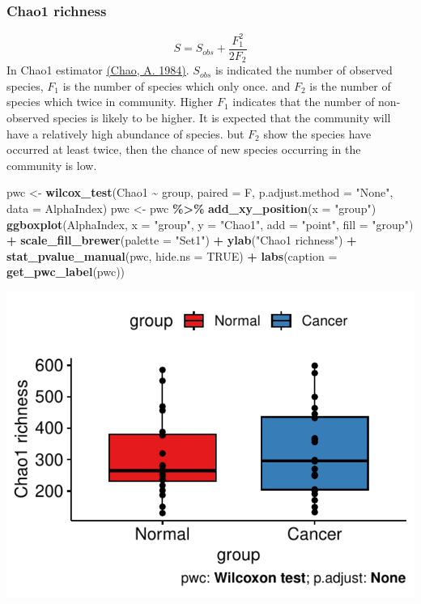 \documentclass[
]{article}
\newenvironment{Shaded}{\begin{snugshade}}{\end{snugshade}}
\newcommand{\AttributeTok}[1]{\textcolor[rgb]{0.13,0.29,0.53}{#1}}
\newcommand{\ConstantTok}[1]{\textcolor[rgb]{0.56,0.35,0.01}{#1}}
\newcommand{\FunctionTok}[1]{\textcolor[rgb]{0.13,0.29,0.53}{\textbf{#1}}}
\newcommand{\NormalTok}[1]{#1}
\newcommand{\OtherTok}[1]{\textcolor[rgb]{0.56,0.35,0.01}{#1}}
\newcommand{\SpecialCharTok}[1]{\textcolor[rgb]{0.81,0.36,0.00}{\textbf{#1}}}
\newcommand{\StringTok}[1]{\textcolor[rgb]{0.31,0.60,0.02}{#1}}
\begin{document}
\hypertarget{chao1-richness}{%
\subsubsection{Chao1 richness}\label{chao1-richness}}

\[ S = S_{obs} + \frac{F^2_1}{2F_2} \] In Chao1 estimator
\href{https://www.researchgate.net/publication/268975118_Non-parametric_estimation_of_the_classes_in_a_population}{(Chao,
A. 1984)}. \(S_{obs}\) is indicated the number of observed species,
\(F_1\) is the number of species which only once. and \(F_2\) is the
number of species which twice in community. Higher \(F_1\) indicates
that the number of non-observed species is likely to be higher. It is
expected that the community will have a relatively high abundance of
species. but \(F_2\) show the species have occurred at least twice, then
the chance of new species occurring in the community is low.

\begin{Shaded}
\begin{Highlighting}[]
\NormalTok{pwc }\OtherTok{\textless{}{-}} \FunctionTok{wilcox\_test}\NormalTok{(Chao1 }\SpecialCharTok{\textasciitilde{}}\NormalTok{ group, }\AttributeTok{paired =}\NormalTok{ F, }\AttributeTok{p.adjust.method =} \StringTok{"None"}\NormalTok{, }\AttributeTok{data =}\NormalTok{ AlphaIndex)}
\NormalTok{pwc }\OtherTok{\textless{}{-}}\NormalTok{ pwc }\SpecialCharTok{\%\textgreater{}\%} \FunctionTok{add\_xy\_position}\NormalTok{(}\AttributeTok{x =} \StringTok{"group"}\NormalTok{)}
\FunctionTok{ggboxplot}\NormalTok{(AlphaIndex, }\AttributeTok{x =} \StringTok{"group"}\NormalTok{, }\AttributeTok{y =} \StringTok{"Chao1"}\NormalTok{, }\AttributeTok{add =} \StringTok{"point"}\NormalTok{, }\AttributeTok{fill =} \StringTok{"group"}\NormalTok{) }\SpecialCharTok{+}
  \FunctionTok{scale\_fill\_brewer}\NormalTok{(}\AttributeTok{palette =} \StringTok{"Set1"}\NormalTok{) }\SpecialCharTok{+} \FunctionTok{ylab}\NormalTok{(}\StringTok{"Chao1 richness"}\NormalTok{) }\SpecialCharTok{+}
  \FunctionTok{stat\_pvalue\_manual}\NormalTok{(pwc, }\AttributeTok{hide.ns =} \ConstantTok{TRUE}\NormalTok{) }\SpecialCharTok{+}
  \FunctionTok{labs}\NormalTok{(}\AttributeTok{caption =} \FunctionTok{get\_pwc\_label}\NormalTok{(pwc))}
\end{Highlighting}
\end{Shaded}

\includegraphics[width=0.7\linewidth,height=0.7\textheight]{workshop_files/figure-latex/unnamed-chunk-17-1}
\end{document}
